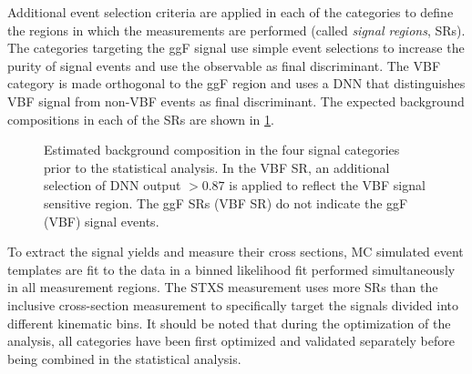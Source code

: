 Additional event selection criteria are applied in each of the categories to define the regions in which the measurements are performed (called \emph{signal regions}, SRs).
The categories targeting the ggF signal use simple event selections to increase the purity of signal events and use the \mT observable as final discriminant. 
The VBF \TwoJet category is made orthogonal to the ggF \TwoJet region and uses a DNN that distinguishes VBF signal from non-VBF events as final discriminant.
The expected background compositions in each of the SRs are shown in \cref{fig:bkg-composition}.
\begin{figure}[ht]
     \hfill
    \caption{Estimated background composition in the four signal categories prior to the statistical analysis. In the VBF \TwoJet SR, an additional selection of DNN output $>0.87$ is applied to reflect the VBF signal sensitive region. The ggF SRs (VBF SR) do not indicate the ggF (VBF) signal events.}
    \label{fig:bkg-composition}
\end{figure}
To extract the signal yields and measure their cross sections, MC simulated event templates are fit to the data in a binned 
likelihood fit performed simultaneously in all measurement regions.
The STXS measurement uses more SRs than the inclusive cross-section measurement to specifically target the signals divided into different kinematic bins. 
It should be noted that during the optimization of the analysis, all categories have been first optimized and validated separately before being combined in the statistical analysis.


